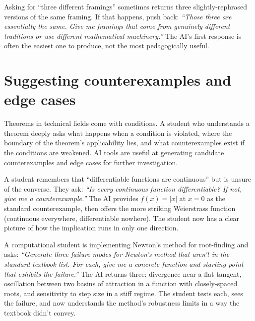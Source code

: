 \documentclass[11pt]{book}
\begin{document}
\begin{watchout}
Asking for ``three different framings'' sometimes returns three slightly-rephrased versions of the same framing. If that happens, push back: \emph{``Those three are essentially the same. Give me framings that come from genuinely different traditions or use different mathematical machinery.''} The AI's first response is often the easiest one to produce, not the most pedagogically useful.
\end{watchout}

\section{Suggesting counterexamples and edge cases}

Theorems in technical fields come with conditions. A student who understands a theorem deeply asks what happens when a condition is violated, where the boundary of the theorem's applicability lies, and what counterexamples exist if the conditions are weakened. AI tools are useful at generating candidate counterexamples and edge cases for further investigation.

\begin{example}
A student remembers that ``differentiable functions are continuous'' but is unsure of the converse. They ask: \emph{``Is every continuous function differentiable? If not, give me a counterexample.''} The AI provides $f(x) = |x|$ at $x = 0$ as the standard counterexample, then offers the more striking Weierstrass function (continuous everywhere, differentiable nowhere). The student now has a clear picture of how the implication runs in only one direction.
\end{example}

\begin{example}
A computational student is implementing Newton's method for root-finding and asks: \emph{``Generate three failure modes for Newton's method that aren't in the standard textbook list. For each, give me a concrete function and starting point that exhibits the failure.''} The AI returns three: divergence near a flat tangent, oscillation between two basins of attraction in a function with closely-spaced roots, and sensitivity to step size in a stiff regime. The student tests each, sees the failure, and now understands the method's robustness limits in a way the textbook didn't convey.
\end{example}
\end{document}
